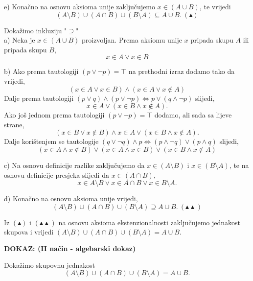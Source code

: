 \documentclass{article}
\begin{document}
    \noindent
    e) Konačno na osnovu aksioma unije zaključujemo $x\in (A\cup B)$, te vrijedi
    $$(A\setminus B)\cup (A\cap B)\cup (B\setminus A)\subseteq A\cup B.\ (\blacktriangle)$$
    \bigskip

    \noindent
    Dokažimo inkluziju "$\supseteq $"\\
    a) Neka je $x\in (A\cup B)$ proizvoljan. Prema aksiomu unije $x$ pripada skupu $A$ ili pripada skupu $B$,
    $$x\in A \vee x\in B$$
    \smallskip

    \noindent
    b) Ako prema tautologiji $(p\vee \lnot p)=\top$ na prethodni izraz dodamo tako da vrijedi,
    $$(x\in A\vee x\in B)\land (x\in A\vee x\notin A)$$
    Dalje prema tautologiji $(p\vee q)\land (p\vee \lnot p)\Leftrightarrow p\vee (q\land \lnot p)$ slijedi,
    $$x\in A\vee (x\in B\land x\notin A).$$
    \newpage\noindent\thispagestyle{empty}
    Ako još jednom prema tautologiji $(p\vee \lnot p)=\top$ dodamo, ali sada sa lijeve strane,
    $$(x\in B\vee x\notin B)\land x\in A\vee (x\in B\land x\notin A).$$
    Dalje korištenjem se tautologije $(q\vee \lnot q)\land p\Leftrightarrow (p\land \lnot q)\vee (p\land q)$ slijedi,
    $$(x\in A\land x\notin B)\vee (x\in A\land x\in B)\vee (x\in B\land x\notin A)$$
    \smallskip

    \noindent
    c) Na osnovu definicije razlike zaključujemo da $x\in (A\setminus B)$ i $x\in (B\setminus A)$, te na osnovu definicije presjeka slijedi da $x\in (A\cap B)$,
    $$x\in A\setminus B\vee x\in A\cap B\vee x\in B\setminus A.$$
    \smallskip

    \noindent
    d) Konačno na osnovu aksioma unije vrijedi,
    $$(A\setminus B)\cup (A\cap B)\cup (B\setminus A)\supseteq A\cup B.\ (\blacktriangle\blacktriangle)$$
    \medskip

    \noindent
    Iz $(\blacktriangle)$ i $(\blacktriangle\blacktriangle)$ na osnovu aksioma ekstenzionalnosti zaključujemo jednakost skupova i vrijedi $(A\setminus B)\cup (A\cap B)\cup (B\setminus A)=A\cup B.$
    \bigskip

    \begin{flushleft}
        \textbf{DOKAZ: (II način - algebarski dokaz)}
    \end{flushleft}

    \noindent
        Dokažimo skupovnu jednakost
        $$(A\setminus B)\cup (A\cap B)\cup (B\setminus A)=A\cup B.$$
\end{document}
